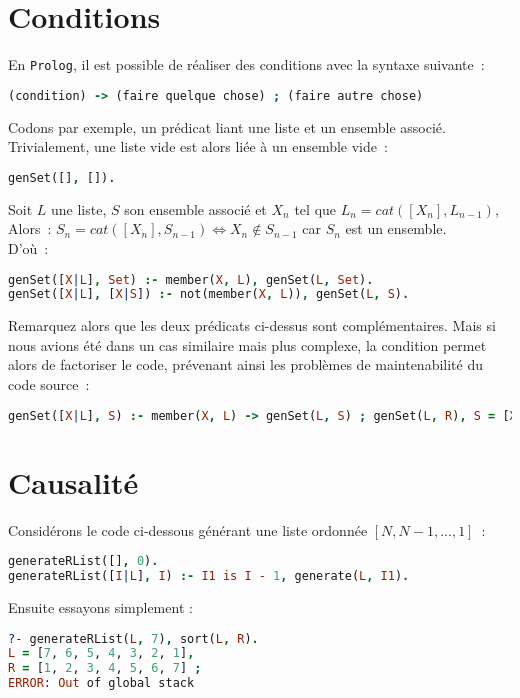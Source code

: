 \section{Conditions}
En \texttt{Prolog}, il est possible de réaliser des conditions avec la syntaxe suivante~:
\begin{lstlisting}[language=Prolog,frame=single]
(condition) -> (faire quelque chose) ; (faire autre chose)
\end{lstlisting}

Codons par exemple, un prédicat liant une liste et un ensemble associé.
Trivialement, une liste vide est alors liée à un ensemble vide~:
\begin{lstlisting}[language=Prolog,frame=single]
genSet([], []).
\end{lstlisting}

Soit $L$ une liste, $S$ son ensemble associé et $X_n$ tel que $L_{n} = cat([X_n], L_{n-1})$,\\
Alors~: $S_{n} = cat([X_n], S_{n-1}) \Leftrightarrow X_n \notin S_{n-1}$ car $S_{n}$ est un ensemble.\\
D'où~:
\begin{lstlisting}[language=Prolog,frame=single]
genSet([X|L], Set) :- member(X, L), genSet(L, Set).
genSet([X|L], [X|S]) :- not(member(X, L)), genSet(L, S).
\end{lstlisting}

Remarquez alors que les deux prédicats ci-dessus sont complémentaires. Mais si nous avions
été dans un cas similaire mais plus complexe, la condition permet alors de factoriser le code, prévenant ainsi les problèmes de maintenabilité du code source~:
\begin{lstlisting}[language=Prolog,frame=single]
genSet([X|L], S) :- member(X, L) -> genSet(L, S) ; genSet(L, R), S = [X|R].
\end{lstlisting}

\section{Causalité}
Considérons le code ci-dessous générant une liste ordonnée $[N, N-1, ..., 1]$~:
\begin{lstlisting}[language=Prolog,frame=single]
generateRList([], 0).
generateRList([I|L], I) :- I1 is I - 1, generate(L, I1).
\end{lstlisting}

Ensuite essayons simplement :
\begin{lstlisting}[language=Prolog,frame=single]
?- generateRList(L, 7), sort(L, R).
L = [7, 6, 5, 4, 3, 2, 1],
R = [1, 2, 3, 4, 5, 6, 7] ;
ERROR: Out of global stack
\end{lstlisting}

